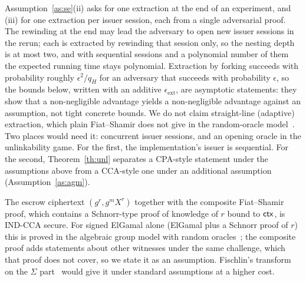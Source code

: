 Assumption~\ref{as:se}(ii) asks for one extraction at the end of an experiment, and (iii) for one extraction per issuer session, each from a single adversarial proof. The rewinding at the end may lead the adversary to open new issuer sessions in the rerun; each is extracted by rewinding that session only, so the nesting depth is at most two, and with sequential sessions and a polynomial number of them the expected running time stays polynomial. Extraction by forking succeeds with probability roughly $\epsilon^2/q_H$ for an adversary that succeeds with probability $\epsilon$, so the bounds below, written with an additive $\epsilon_{\mathrm{ext}}$, are asymptotic statements: they show that a non-negligible advantage yields a non-negligible advantage against an assumption, not tight concrete bounds. We do not claim straight-line (adaptive) extraction, which plain Fiat--Shamir does not give in the random-oracle model~\cite{bernhard2015apok}. Two places would need it: concurrent issuer sessions, and an opening oracle in the unlinkability game. For the first, the implementation's issuer is sequential. For the second, Theorem~\ref{th:unl} separates a CPA-style statement under the assumptions above from a CCA-style one under an additional assumption (Assumption~\ref{as:agm}).

\begin{assumption}\label{as:agm}
The escrow ciphertext $(g^{r},g^{m}X^{r})$ together with the composite Fiat--Shamir proof, which contains a Schnorr-type proof of knowledge of $r$ bound to $\mathsf{ctx}$, is IND-CCA secure. For signed ElGamal alone (ElGamal plus a Schnorr proof of $r$) this is proved in the algebraic group model with random oracles~\cite{fuchsbauer2020schnorr}; the composite proof adds statements about other witnesses under the same challenge, which that proof does not cover, so we state it as an assumption. Fischlin's transform on the $\Sigma$ part~\cite{fischlin2005online} would give it under standard assumptions at a higher cost.
\end{assumption}

